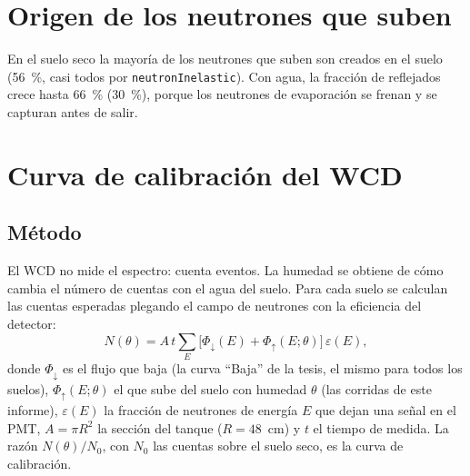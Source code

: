 \documentclass[11pt,a4paper]{article}
\newcommand{\tabla}[1]{}
\begin{document}
\section{Origen de los neutrones que suben}
\begin{table}[H]
	\centering\small
\caption{Origen de los cruces hacia arriba del plano: el neutrón incidente reflejado, uno creado por dispersión
	inelástica de un neutrón (\texttt{neutronInelastic}: evaporación y $(n,xn)$) u otros procesos (protones, piones,
	capturas de hadrones en reposo).}\label{tab:orig}
\tabla{origen}
\end{table}

En el suelo seco la mayoría de los neutrones que suben son creados en el suelo (56~\%, casi todos por \texttt{neutronInelastic}). Con agua, la fracción de
reflejados crece hasta 66~\% (30~\%), porque los neutrones de evaporación se frenan y se capturan antes de salir.

\section{Curva de calibración del WCD}\label{sec:cal}
\subsection{Método}
El WCD no mide el espectro: cuenta eventos. La humedad se obtiene de cómo cambia el número de cuentas con el agua del
suelo. Para cada suelo se calculan las cuentas esperadas plegando el campo de neutrones con la eficiencia del detector:
\begin{equation}
N(\theta) = A\,t \sum_E \big[\Phi_\downarrow(E) + \Phi_\uparrow(E;\theta)\big]\,\varepsilon(E),
\end{equation}
donde $\Phi_\downarrow$ es el flujo que baja (la curva ``Baja'' de la tesis, el mismo para todos los suelos),
$\Phi_\uparrow(E;\theta)$ el que sube del suelo con humedad $\theta$ (las corridas de este informe), $\varepsilon(E)$ la
fracción de neutrones de energía $E$ que dejan una señal en el PMT, $A=\pi R^2$ la sección del tanque ($R=48$~cm) y $t$
el tiempo de medida. La razón $N(\theta)/N_0$, con $N_0$ las cuentas sobre el suelo seco, es la curva de calibración.
\end{document}
